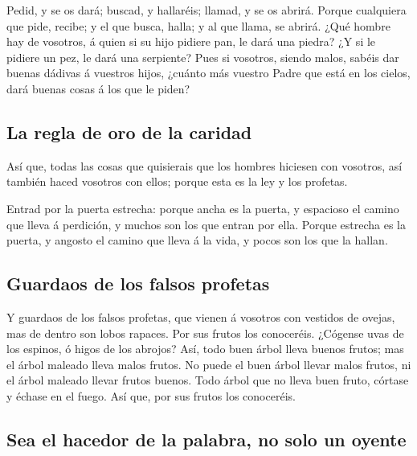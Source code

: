  Pedid, y se os dará; buscad, y hallaréis; llamad, y se os
abrirá.  Porque cualquiera que pide, recibe; y el que
busca, halla; y al que llama, se abrirá.  ¿Qué hombre hay
de vosotros, á quien si su hijo pidiere pan, le dará una piedra?
 ¿Y si le pidiere un pez, le dará una serpiente?
 Pues si vosotros, siendo malos, sabéis dar buenas
dádivas á vuestros hijos, ¿cuánto más vuestro Padre que está en los
cielos, dará buenas cosas á los que le piden?

\hypertarget{la-regla-de-oro-de-la-caridad}{%
\subsection{La regla de oro de la
caridad}\label{la-regla-de-oro-de-la-caridad}}

 Así que, todas las cosas que quisierais que los hombres
hiciesen con vosotros, así también haced vosotros con ellos; porque esta
es la ley y los profetas.

 Entrad por la puerta estrecha: porque ancha es la
puerta, y espacioso el camino que lleva á perdición, y muchos son los
que entran por ella.  Porque estrecha es la puerta, y
angosto el camino que lleva á la vida, y pocos son los que la hallan.

\hypertarget{guardaos-de-los-falsos-profetas}{%
\subsection{Guardaos de los falsos
profetas}\label{guardaos-de-los-falsos-profetas}}

 Y guardaos de los falsos profetas, que vienen á vosotros
con vestidos de ovejas, mas de dentro son lobos rapaces. 
Por sus frutos los conoceréis. ¿Cógense uvas de los espinos, ó higos de
los abrojos?  Así, todo buen árbol lleva buenos frutos;
mas el árbol maleado lleva malos frutos.  No puede el
buen árbol llevar malos frutos, ni el árbol maleado llevar frutos
buenos.  Todo árbol que no lleva buen fruto, córtase y
échase en el fuego.  Así que, por sus frutos los
conoceréis.

\hypertarget{sea-el-hacedor-de-la-palabra-no-solo-un-oyente}{%
\subsection{Sea el hacedor de la palabra, no solo un
oyente}\label{sea-el-hacedor-de-la-palabra-no-solo-un-oyente}}

